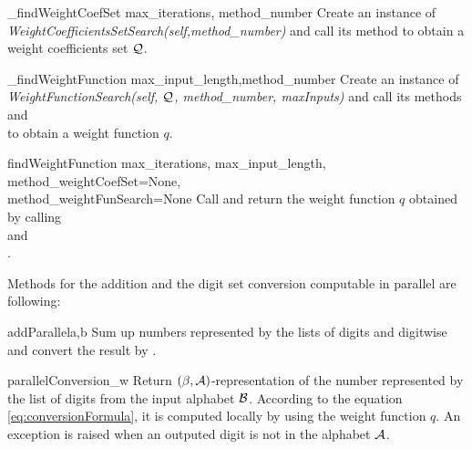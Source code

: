 \begin{method}{\_findWeightCoefSet}{ max\_iterations, method\_number}
Create an instance of \emph{WeightCoefficientsSetSearch(self,method\_number)} and call its method  to obtain a weight coefficients set $\mathcal{Q}$.
\end{method}

\begin{method}{\_findWeightFunction}{ max\_input\_length,method\_number}
Create an instance of \emph{WeightFunctionSearch(self, $\mathcal{Q}$, method\_number, maxInputs)} and call its methods  and \\  to obtain a weight function $q$.
\end{method}


\begin{method}{findWeightFunction}{ max\_iterations, max\_input\_length, method\_weightCoefSet=None,\\ method\_weightFunSearch=None}
Call  and return the weight function $q$ obtained by calling \\  and \\ .
\end{method}

%


Methods for the addition and the digit set conversion computable in parallel are following:

\begin{method}{addParallel}{a,b}
Sum up numbers represented by the lists of digits  and  digitwise and convert the result by . 
\end{method}


\begin{method}{parallelConversion}{\_w}
Return $(\beta,\mathcal{A})$-representation of the number represented by the list  of digits from the input alphabet $\mathcal{B}$. According to the equation \eqref{eq:conversionFormula}, it is computed locally by using the weight function $q$. An exception is raised when an outputed digit is not in the alphabet $\mathcal{A}$.
\end{method}


